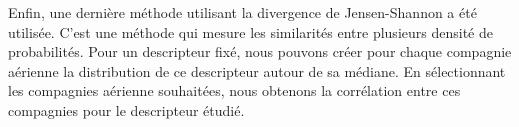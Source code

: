 Enfin, une dernière méthode utilisant la divergence de Jensen-Shannon a été utilisée. C'est une méthode qui mesure les similarités entre plusieurs densité de probabilités. Pour un descripteur fixé, nous pouvons créer pour chaque compagnie aérienne la distribution de ce descripteur autour de sa médiane. En sélectionnant les compagnies aérienne souhaitées, nous obtenons la corrélation entre ces compagnies pour le descripteur étudié. \\

